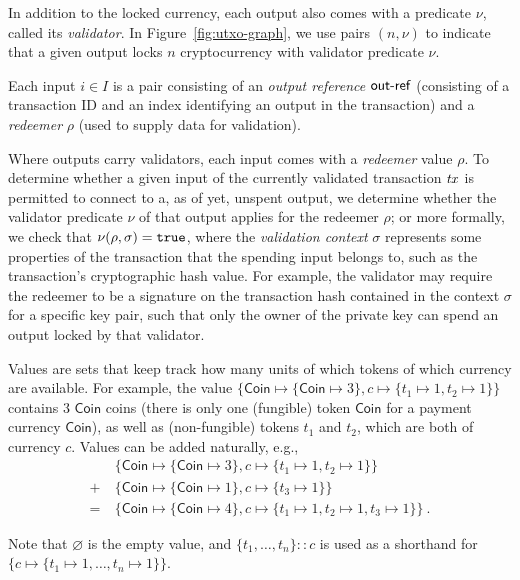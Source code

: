 \begin{definition}
In addition to the locked currency, each output also comes with a predicate $\nu$, called its \emph{validator}. In Figure~\ref{fig:utxo-graph}, we use pairs \((n, \nu)\) to indicate that a given output locks $n$ cryptocurrency with validator predicate $\nu$.
\end{definition}

\begin{definition}[Inputs]
Each input \(i\in I\) is a pair consisting of an \emph{output reference} $\mathsf{out\textsf{-}{}ref}$ (consisting of a transaction ID and an index identifying an output in the transaction) and a \emph{redeemer} $\rho$ (used to supply data for validation).
\end{definition}

\begin{definition}[Redeemer]
Where outputs carry validators, each input comes with a \emph{redeemer} value $\rho$. To determine whether a given input of the currently validated transaction $\mathit{tx}$ is permitted to connect to a, as of yet, unspent output, we determine whether the validator predicate $\nu$ of that output applies for the redeemer $\rho$; or more formally, we check that \(\nu(\rho, \sigma) = \mathtt{true}\), where the \emph{validation context} $\sigma$ represents some properties of the transaction that the spending input belongs to, such as the transaction's cryptographic hash value. For example, the validator may require the redeemer to be a signature on the transaction hash contained in the context $\sigma$ for a specific key pair, such that only the owner of the private key can spend an output locked by that validator.
\end{definition}

\begin{definition}[Values]
Values are sets that keep track how many units of which tokens of
which currency are available.  For example, the value
$\{\mathsf{Coin} \mapsto \{\mathsf{Coin} \mapsto 3\}, c \mapsto \{t_1
\mapsto 1, t_2 \mapsto 1\}\}$ contains $3$ $\mathsf{Coin}$ coins
(there is only one (fungible) token $\mathsf{Coin}$ for a payment
currency $\mathsf{Coin}$), as well as (non-fungible) tokens $t_1$ and $t_2$, which
are both of currency $c$.  Values can be added naturally, e.g.,
\begin{align*}
  & \{\mathsf{Coin} \mapsto \{\mathsf{Coin} \mapsto 3\}, c \mapsto \{t_1
    \mapsto 1, t_2 \mapsto 1\}\} \\
  + \ & \{\mathsf{Coin} \mapsto \{\mathsf{Coin} \mapsto 1\}, c \mapsto \{t_3 \mapsto 1\}\} \\
  = \ & \{\mathsf{Coin} \mapsto \{\mathsf{Coin} \mapsto 4\}, c \mapsto \{t_1
        \mapsto 1, t_2 \mapsto 1, t_3 \mapsto 1\}\} \ .
\end{align*}

Note that $\varnothing$ is the empty value, and
\(\{t_1, \ldots, t_n\} :: c\) is used as a shorthand for
\(\{c \mapsto \{t_1 \mapsto 1, \ldots, t_n \mapsto 1\}\}\). 
\end{definition}

